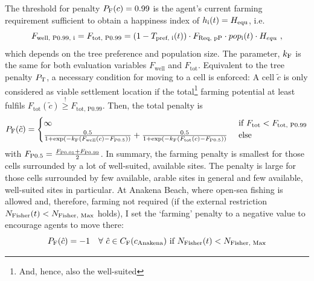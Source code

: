 The threshold for penalty $P_{\rm F}(c)=0.99$ is the agent's current farming requirement sufficient to obtain a happiness index of $h_{\rm i}(t) = H_{\rm equ}$, i.e.\
\begin{equation} 
F_\text{well, P0.99, i} = F_\text{tot, P0.99} = (1-T_\text{pref, i}(t))\cdot F_\text{Req, pP}\cdot pop_{\rm i}(t) \cdot H_{equ} \ , 
\end{equation}
which depends on the tree preference and population size.
The parameter, $k_{\rm F}$ is the same for both evaluation variables $F_\text{well} $ and $F_\text{tot}$.
Equivalent to the tree penalty $P_{\rm T}$, a necessary condition for moving to a cell is enforced:
 A cell $\tilde{c}$ is only considered as viable settlement location if the total\footnote{And, hence, also the well-suited} farming potential at least fulfils
 $F_\text{tot}(\tilde{c})  \stackrel{!}{\geq} F_\text{tot, P0.99}$.
Then, the total penalty is 
\begin{equation}
P_{\rm F} (\tilde{c}) = 
\begin{cases} 
\infty & \text{ if } F_\text{tot} < F_\text{tot, P0.99}\\
\frac{0.5}{1+\exp\left( - k_{\rm F} (F_\text{well}(c)-F_\text{P0.5}) \right)} + \frac{0.5}{1+\exp\left( - k_{\rm F} (F_\text{tot}(c)-F_\text{P0.5}) \right)} & \text{ else}
\end{cases}
\end{equation}
with $F_\text{P0.5} = \frac{F_{\rm P0.01}+F_{\rm P0.99}}{2}$.
In summary, the farming penalty is smallest for those cells surrounded by a lot of well-suited, available sites.
The penalty is large for those cells surrounded by few available, arable sites in general and few available, well-suited sites in particular.
At Anakena Beach, where open-sea fishing is allowed and, therefore, farming not required (if the external restriction $N_{\rm Fisher}(t)<N_\text{Fisher, Max}$ holds), I set the `farming' penalty to a negative value to encourage agents to move there:
\begin{equation}
	P_{\rm F}(\hat{c}) = - 1 %
	 \quad \forall \  \hat{c} \in C_\text{F}(c_{\rm Anakena}) \text{ if }N_{\rm Fisher}(t)<N_\text{Fisher, Max}
\end{equation}


